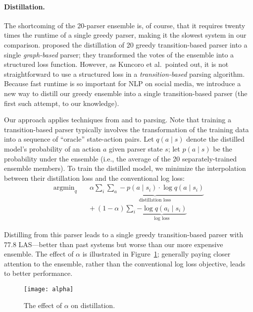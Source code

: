 \documentclass[11pt,a4paper]{article}
\DeclareMathOperator*{\argmin}{argmin}
\begin{document}
\paragraph{Distillation.}  The shortcoming of the 20-parser ensemble is, of
course, that it requires twenty times the runtime of a single greedy
parser, making it the slowest system in our comparison.   proposed the distillation of 20
greedy transition-based parser into a single \emph{graph-based}
parser; they transformed the votes of the ensemble into a structured
loss function.  However, as Kuncoro et al.~pointed out, 
it is not straightforward to use a structured
loss in a \emph{transition-based} parsing algorithm.  Because fast
runtime is so important for NLP on social media, we
introduce a new way to distill our greedy ensemble into a single
transition-based parser (the first such attempt, to our knowledge).  

Our approach applies techniques from 
and  to parsing.
Note that training a transition-based parser typically involves the
transformation of the training data into a sequence of ``oracle'' state-action
pairs.
Let $q(a \mid s)$ denote the distilled model's
probability of an action $a$ given parser state $s$; let $p(a\mid s)$ be the probability under the
ensemble (i.e., the average of the 20 separately-trained ensemble
members).
To train the distilled model, we minimize the interpolation between
their distillation loss and the conventional log loss:
\begin{align}
{\argmin}_q \quad  & \alpha \sum_i \underbrace{\sum_{a} -p(a
	\mid s_i) \cdot \log q(a \mid s_i)}_{\text{distillation loss}} \\
& +\ (1 - \alpha) \sum_i \underbrace{- \log q(a_i \mid
  s_i)}_{\text{log loss}} \nonumber
\end{align}

Distilling from this 
parser leads to a single greedy transition-based parser with 77.8
LAS---better than past systems but worse than our more expensive ensemble.
The effect of $\alpha$ is illustrated in
Figure~\ref{fig:effect-alpha}; generally paying closer attention to
the ensemble, rather than the conventional log loss objective, leads
to better performance.

\begin{figure}[t]
	\centering
	\texttt{[image: alpha]}
	\caption{The effect of $\alpha$ on distillation.\label{fig:effect-alpha}}
\end{figure}
\end{document}
